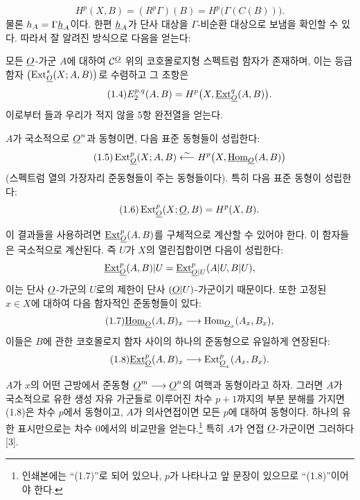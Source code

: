 \begin{equation}\tag{1.3}
  H^{p}(X,B)=(R^{p}\Gamma)(B)=H^{p}\bigl(\Gamma(C(B))\bigr).
\end{equation}
물론 $h_A=\Gamma\underline{h}_A$이다. 한편 $\underline{h}_A$가
단사 대상을 $\Gamma$-비순환 대상으로 보냄을 확인할 수 있다. 따라서
잘 알려진 방식으로 다음을 얻는다:

 모든 $\underline{O}$-가군 $A$에 대하여 $\mathcal C^{\underline{O}}$ 위의
코호몰로지형 스펙트럼 함자가 존재하며, 이는 등급 함자
$\bigl(\operatorname{Ext}_{\underline{O}}^{*}(X;A,B)\bigr)$로 수렴하고 그 초항은
\begin{equation}\tag{1.4}
  E_{2}^{p,q}(A,B)=H^{p}\bigl(X,\underline{\operatorname{Ext}}_{\underline{O}}^{q}(A,B)\bigr).
\end{equation}
이로부터 들과 우리가 적지 않을 5항
완전열을 얻는다.

 $A$가 국소적으로 $\underline{O}^{n}$과 동형이면, 다음 표준
동형들이 성립한다:
\begin{equation}\tag{1.5}
  \operatorname{Ext}_{\underline{O}}^{p}(X;A,B)
  \overset{\sim}{\longleftarrow}
  H^{p}\bigl(X,\underline{\operatorname{Hom}}_{\underline{O}}(A,B)\bigr)
\end{equation}
(스펙트럼 열의 가장자리 준동형들이 주는 동형들이다). 특히 다음 표준
동형이 성립한다:
\begin{equation}\tag{1.6}
  \operatorname{Ext}_{\underline{O}}^{p}(X;\underline{O},B)=H^{p}(X,B).
\end{equation}

이 결과들을 사용하려면 $\underline{\operatorname{Ext}}_{\underline{O}}^{p}(A,B)$를 구체적으로
계산할 수 있어야 한다. 이 함자들은 국소적으로 계산된다.
즉 $U$가 $X$의 열린집합이면 다음이 성립한다:
\[
  \underline{\operatorname{Ext}}_{\underline{O}}^{p}(A,B)|U
  =\underline{\operatorname{Ext}}_{\underline{O}|U}^{p}(A|U,B|U),
\]
이는 단사 $\underline{O}$-가군의 $U$로의 제한이
단사 $(\underline{O}|U)$-가군이기 때문이다. 또한 고정된 $x\in X$에 대하여
다음 함자적인 준동형들이 있다:
\begin{equation}\tag{1.7}
  \underline{\operatorname{Hom}}_{\underline{O}}(A,B)_x
  \longrightarrow
  \operatorname{Hom}_{\underline{O}_x}(A_x,B_x),
\end{equation}
이들은 $B$에 관한 코호몰로지 함자 사이의 하나의 준동형으로 유일하게
연장된다:
\begin{equation}\tag{1.8}
  \underline{\operatorname{Ext}}_{\underline{O}}^{p}(A,B)_x
  \longrightarrow
  \operatorname{Ext}_{\underline{O}_x}^{p}(A_x,B_x).
\end{equation}

 $A$가 $x$의 어떤 근방에서
준동형 $\underline{O}^{m}\longrightarrow\underline{O}^{n}$의 여핵과 동형이라고 하자. 그러면 $A$가 국소적으로 유한 생성 자유 가군들로 이루어진 차수 $p+1$까지의 부분 분해를 가지면 (1.8)은 차수 $p$에서 동형이고, $A$가 의사연접이면 모든 $p$에 대하여 동형이다. 하나의 유한 표시만으로는 차수 0에서의 비교만을 얻는다.\footnote{인쇄본에는 “(1.7)”로 되어 있으나,
$p$가 나타나고 앞 문장이 있으므로 “(1.8)”이어야 한다.} 특히
$A$가 연접 $\underline{O}$-가군이면 그러하다 [3].


